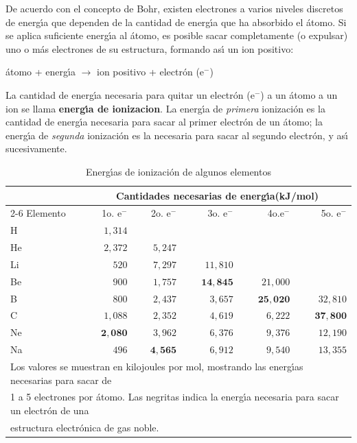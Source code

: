 De acuerdo con el concepto de Bohr, existen electrones a varios niveles discretos de
energ\'{\i}a que dependen de la cantidad de energ\'{\i}a que ha absorbido el
\'atomo. Si se aplica suficiente energ\'{\i}a al \'atomo, es posible sacar
completamente (o expulsar) uno o m\'as electrones de su estructura, formando
as\'{\i} un ion positivo:
\begin{center}
\'atomo + energ\'{\i}a $\longrightarrow$ ion positivo + electr\'on (e$^-$)
\end{center}
La cantidad de energ\'{\i}a necesaria para quitar un electr\'on (e$^-$) a un \'atomo  a un ion se llama \textbf{energ\'{\i}a de \gls{ionizacion}}. La energ\'{\i}a de \textit{primera} ionizaci\'on es la cantidad de energ\'{\i}a necesaria para sacar al primer electr\'on de un \'atomo; la energ\'{\i}a de \textit{segunda} ionizaci\'on es la necesaria para sacar al segundo electr\'on, y as\'{\i} sucesivamente.
\begin{table}
\caption[Energ\'{\i}as de ionizaci\'on]{Energ\'{\i}as de ionizaci\'on de algunos elementos}
\label{ionizacion}
\begin{center}
\begin{tabular}{l r r r r r}\hline
&\multicolumn{5}{c}{\textbf{Cantidades necesarias de energ\'{\i}a(kJ/mol)}}\\
\cline{2-6}
  Elemento &1o. e$^-$&2o. e$^-$&3o. e$^-$&4o.e$^-$&5o. e$^-$\\ \hline
H  &$1,314 $\\
He &$2,372 $& $5,247$\\
Li &$520   $& $7,297$ & $11,810$ \\
Be &$900   $& $1,757$ & $\mathbf{14,845}$ &$ 21,000$\\
B  &$800   $& $2,437$ & $ 3,657$ & $\mathbf{25,020}$&$ 32,810$\\
C  &$1,088$ & $2,352$ & $ 4,619$ &$  6,222$&  $\mathbf{37,800}$\\
Ne &$\mathbf{2,080}$ & $3,962 $& $ 6,376$ &  $9,376$& $ 12,190$\\
Na &$ 496$ & $\mathbf{4,565}$ & $ 6,912$ &  $9,540$&  $13,355$\\\hline
\multicolumn{6}{l}{\tiny Los valores se muestran en kilojoules por mol,
mostrando las energ\'{\i}as necesarias para sacar de}\\[-.1in]
\multicolumn{6}{l}{\tiny 1 a 5 electrones por \'atomo. 
Las negritas indica la energ\'{\i}a necesaria para sacar un electr\'on de
una}\\[-.1in]
\multicolumn{6}{l}{\tiny   estructura
electr\'onica de gas noble.}\\
\end{tabular}
\end{center}
\end{table}


